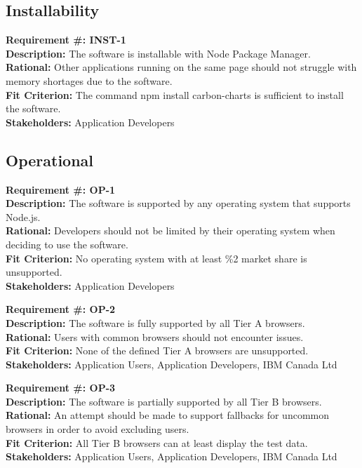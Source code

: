 \documentclass[12pt, titlepage]{article}
\begin{document}
\subsection{Installability}
\begin{flushleft}
\textbf{Requirement \#: INST-1} \\
\textbf{Description:} The software is installable with Node Package Manager. \\
\textbf{Rational:} Other applications running on the same page should not struggle with memory shortages due to the software. \\
\textbf{Fit Criterion:} The command npm install carbon-charts is sufficient to install the software.\\
\textbf{Stakeholders:} Application Developers \\
\end{flushleft}
\subsection{Operational}
\begin{flushleft}
\textbf{Requirement \#: OP-1} \\
\textbf{Description:} The software is supported by any operating system that supports Node.js. \\
\textbf{Rational:} Developers should not be limited by their operating system when deciding to use the software. \\
\textbf{Fit Criterion:} No operating system with at least \%2 market share is unsupported. \\
\textbf{Stakeholders:} Application Developers \\
\end{flushleft}
\begin{flushleft}
\textbf{Requirement \#: OP-2} \\
\textbf{Description:} The software is fully supported by all Tier A browsers. \\
\textbf{Rational:} Users with common browsers should not encounter issues.\\
\textbf{Fit Criterion:} None of the defined Tier A browsers are unsupported.\\
\textbf{Stakeholders:} Application Users, Application Developers, IBM Canada Ltd \\
\end{flushleft}
\begin{flushleft}
\textbf{Requirement \#: OP-3} \\
\textbf{Description:} The software is partially supported by all Tier B browsers. \\
\textbf{Rational:} An attempt should be made to support fallbacks for uncommon browsers in order to avoid excluding users. \\
\textbf{Fit Criterion:} All Tier B browsers can at least display the test data. \\
\textbf{Stakeholders:} Application Users, Application Developers, IBM Canada Ltd \\
\end{flushleft}
\end{document}
